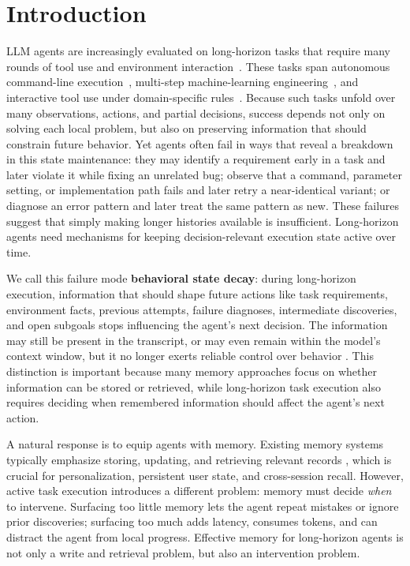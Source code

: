 \section{Introduction}
\label{section:intro}

LLM agents are increasingly evaluated on long-horizon tasks that require many rounds of tool use and environment interaction~\citep{yao2023react,shinn2023reflexion,wang2024voyager}. These tasks span autonomous command-line execution~\citep{merrill2026terminalbench}, multi-step machine-learning engineering~\citep{chan2024mlebench}, and interactive tool use under domain-specific rules~\citep{yao2024taubench,barres2025tau2bench}. Because such tasks unfold over many observations, actions, and partial decisions, success depends not only on solving each local problem, but also on preserving information that should constrain future behavior. Yet agents often fail in ways that reveal a breakdown in this state maintenance: they may identify a requirement early in a task and later violate it while fixing an unrelated bug; observe that a command, parameter setting, or implementation path fails and later retry a near-identical variant; or diagnose an error pattern and later treat the same pattern as new. These failures suggest that simply making longer histories available is insufficient. Long-horizon agents need mechanisms for keeping decision-relevant execution state active over time.

We call this failure mode \textbf{behavioral state decay}: during long-horizon execution, information that should shape future actions like task requirements, environment facts, previous attempts, failure diagnoses, intermediate discoveries, and open subgoals stops influencing the agent's next decision. The information may still be present in the transcript, or may even remain within the model's context window, but it no longer exerts reliable control over behavior \citep{liu2024lost}. This distinction is important because many memory approaches focus on whether information can be stored or retrieved, while long-horizon task execution also requires deciding when remembered information should affect the agent's next action.

A natural response is to equip agents with memory. Existing memory systems typically emphasize storing, updating, and retrieving relevant records \citep{packer2023memgpt,zhong2024memorybank,park2023generative,mem0ai2026mem0}, which is crucial for personalization, persistent user state, and cross-session recall. However, active task execution introduces a different problem: memory must decide \emph{when} to intervene. Surfacing too little memory lets the agent repeat mistakes or ignore prior discoveries; surfacing too much adds latency, consumes tokens, and can distract the agent from local progress. Effective memory for long-horizon agents is not only a write and retrieval problem, but also an intervention problem.


